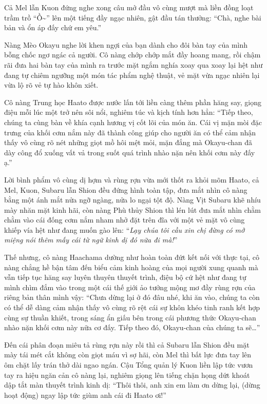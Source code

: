 \documentclass[../main.tex]{subfiles}
\begin{document}

Cả Mel lẫn Kuon đứng nghe xong câu mở đầu vô cùng mượt mà liền đồng loạt trầm trồ ``Ồ\~{}'' lên một tiếng đầy ngạc nhiên, gật đầu tán thưởng: ``Chà, nghe bài bản và ổn áp đấy chứ em yêu.''

Nàng Mèo Okayu nghe lời khen ngợi của bạn dành cho đôi bàn tay của mình bỗng chốc ngơ ngác cả người. Cô nàng chớp chớp mắt đầy hoang mang, rồi chậm rãi đưa hai bàn tay của mình ra trước mặt ngắm nghía xoay qua xoay lại hệt như đang tự chiêm ngưỡng một món tác phẩm nghệ thuật, vẻ mặt vừa ngạc nhiên lại vừa lộ rõ vẻ tự hào khôn xiết.

Cô nàng Trung học Haato được nước lấn tới liền càng thêm phần hăng say, giọng điệu mỗi lúc một trở nên sôi nổi, nghiêm túc và kịch tính hơn hẳn: ``Tiếp theo, chúng ta cùng bàn về khía cạnh hương vị cốt lõi của món ăn. Cái vị mặn mòi đặc trưng của khối cơm nắm này đã thành công giúp cho người ăn có thể cảm nhận thấy vô cùng rõ nét những giọt mồ hôi mệt mỏi, mặn đắng mà Okayu-chan đã dày công đổ xuống vất vả trong suốt quá trình nhào nặn nên khối cơm này đấy ạ.''

Lời bình phẩm vô cùng dị hợm và rùng rợn vừa mới thốt ra khỏi mõm Haato, cả Mel, Kuon, Subaru lẫn Shion đều đứng hình toàn tập, đưa mắt nhìn cô nàng bằng một ánh mắt nửa ngỡ ngàng, nửa lo ngại tột độ. Nàng Vịt Subaru khẽ nhíu mày nhăn mặt kinh hãi, còn nàng Phù thủy Shion thì lén lút đưa mắt nhìn chằm chằm vào cái đống cơm nắm nham nhở đặt trên đĩa với một vẻ mặt vô cùng khiếp vía hệt như đang muốn gào lên: ``\textit{Lạy chúa tôi cầu xin chị đừng có mở miệng nói thêm mấy cái từ ngữ kinh dị đó nữa đi mà!}''

Thế nhưng, cô nàng Haachama dường như hoàn toàn đứt kết nối với thực tại, cô nàng chẳng hề bận tâm đến biểu cảm kinh hoàng của mọi người xung quanh mà vẫn tiếp tục hăng say luyên thuyên thuyết trình, điệu bộ cứ hệt như đang tự mình chìm đắm vào trong một cái thế giới ảo tưởng mộng mơ đầy rùng rợn của riêng bản thân mình vậy: ``Chưa dừng lại ở đó đâu nhé, khi ăn vào, chúng ta còn có thể dễ dàng cảm nhận thấy vô cùng rõ rệt cái sự khôn khéo tinh ranh kết hợp cùng sự thuần khiết, trong sáng ẩn giấu bên trong cái phương thức Okayu-chan nhào nặn khối cơm này nữa cơ đấy. Tiếp theo đó, Okayu-chan của chúng ta sẽ\dots''


Đến cái phân đoạn miêu tả rùng rợn này rồi thì cả Subaru lẫn Shion đều mặt mày tái mét cắt không còn giọt máu vì sợ hãi, còn Mel thì bất lực đưa tay lên ôm chặt lấy trán thở dài ngao ngán. Cậu Tổng quản lý Kuon liền lập tức vươn tay ra hiệu ngăn cản cô nàng lại, nghiêm giọng lên tiếng chặn họng dứt khoát dập tắt màn thuyết trình kinh dị: ``Thôi thôi, anh xin em làm ơn dừng lại,  (dừng hoạt động) ngay lập tức giùm anh cái đi Haato ơi!''
\end{document}
